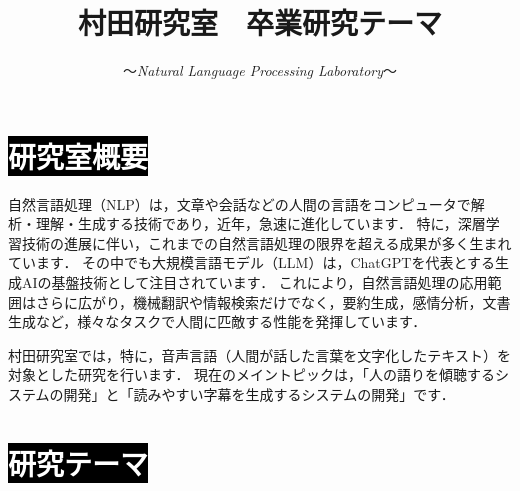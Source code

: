 \documentclass[10.5pt,onecolumn]{jsarticle}
\title{{\huge{\textbf{村田研究室　卒業研究テーマ}}}}
\author{〜{\it Natural Language Processing Laboratory}〜}
\date{\texttt{}}
\newcommand{\dg}{\gt}
\begin{document}
\maketitle
\baselineskip11pt

\vspace{-15mm}
  \section*{\colorbox{black}{\textcolor{white}{{\LARGE 研究室概要}}}}

  自然言語処理（NLP）は，文章や会話などの人間の言語をコンピュータで解析・理解・生成する技術であり，近年，急速に進化しています．
  特に，深層学習技術の進展に伴い，これまでの自然言語処理の限界を超える成果が多く生まれています．
  その中でも大規模言語モデル（LLM）は，ChatGPTを代表とする生成AIの基盤技術として注目されています．
  これにより，自然言語処理の応用範囲はさらに広がり，機械翻訳や情報検索だけでなく，要約生成，感情分析，文書生成など，様々なタスクで人間に匹敵する性能を発揮しています．


  \vspace{1mm}
  村田研究室では，特に，{\Large {\dg 音声言語}}（人間が話した言葉を文字化したテキスト）を対象とした研究を行います．
  現在のメイントピックは，「{\dg 人の語りを傾聴するシステムの開発}」と「{\dg 読みやすい字幕を生成するシステムの開発}」です．

  \vspace{-1mm}
  \section*{\colorbox{black}{\textcolor{white}{{\LARGE 研究テーマ}}}}
\end{document}
